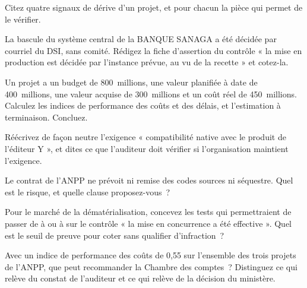 \bigskip

\begin{boxexo}[title={\ding{45}\quad Exercice~19.4. Signaux de dérive \niveaubase}]
Citez quatre signaux de dérive d'un projet, et pour chacun la pièce qui
permet de le vérifier.
\end{boxexo}

\begin{boxexo}[title={\ding{45}\quad Exercice~19.5. La décision de mise en production \niveaumoyen}]
La bascule du système central de la BANQUE SANAGA a été décidée par
courriel du DSI, sans comité. Rédigez la fiche d'assertion du contrôle
« la mise en production est décidée par l'instance prévue, au vu de la
recette » et cotez-la.
\end{boxexo}

\begin{boxexo}[title={\ding{45}\quad Exercice~19.6. Indice de performance \niveaumoyen}]
Un projet a un budget de 800~millions, une valeur planifiée à date de
400~millions, une valeur acquise de 300~millions et un coût réel de
450~millions. Calculez les indices de performance des coûts et des délais,
et l'estimation à terminaison. Concluez.
\end{boxexo}

\begin{boxexo}[title={\ding{45}\quad Exercice~19.7. Le cahier des charges \niveaumoyen}]
Réécrivez de façon neutre l'exigence « compatibilité native avec le
produit de l'éditeur Y », et dites ce que l'auditeur doit vérifier si
l'organisation maintient l'exigence.
\end{boxexo}

\begin{boxexo}[title={\ding{45}\quad Exercice~19.8. La réversibilité \niveaumoyen}]
Le contrat de l'ANPP ne prévoit ni remise des codes sources ni séquestre.
Quel est le risque, et quelle clause proposez-vous~?
\end{boxexo}

\begin{boxexo}[title={\ding{45}\quad Exercice~19.9. Offre unique \niveauexpert}]
Pour le marché de la dématérialisation, concevez les tests qui
permettraient de passer de \NEK{} à \OUI{} ou à \NON{} sur le contrôle
« la mise en concurrence a été effective ». Quel est le seuil de preuve
pour coter \NON{} sans qualifier d'infraction~?
\end{boxexo}

\begin{boxexo}[title={\ding{45}\quad Exercice~19.10. Arrêter ou continuer~? \niveauexpert}]
Avec un indice de performance des coûts de 0,55 sur l'ensemble des trois
projets de l'ANPP, que peut recommander la Chambre des comptes~?
Distinguez ce qui relève du constat de l'auditeur et ce qui relève de la
décision du ministère.
\end{boxexo}

